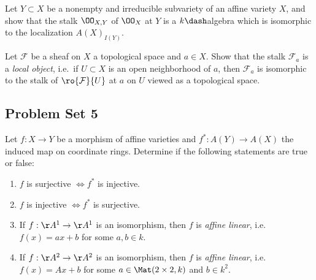 \begin{problem}

Let \(Y\subset X\) be a nonempty and irreducible subvariety of an affine
variety \(X\), and show that the stalk \(\OO_{X, Y}\) of \(\OO_X\) at
\(Y\) is a \(k\dash\)algebra which is isomorphic to the localization
\(A(X)_{I(Y)}\).

\end{problem}

\begin{problem}[Gathmann 3.24]

Let \(\mathcal{F}\) be a sheaf on \(X\) a topological space and
\(a\in X\). Show that the stalk \(\mathcal{F}_a\) is a \emph{local
object}, i.e.~if \(U\subset X\) is an open neighborhood of \(a\), then
\(\mathcal{F}_a\) is isomorphic to the stalk of
\(\ro{ \mathcal{F} }{U}\) at \(a\) on \(U\) viewed as a topological
space.

\end{problem}

\hypertarget{problem-set-5}{%
\subsection{Problem Set 5}\label{problem-set-5}}

\begin{problem}[Gathmann 4.13]

Let \(f:X\to Y\) be a morphism of affine varieties and
\(f^*: A(Y) \to A(X)\) the induced map on coordinate rings. Determine if
the following statements are true or false:

\begin{enumerate}
\def\labelenumi{\alph{enumi}.}
\item
  \(f\) is surjective \(\iff f^*\) is injective.
\item
  \(f\) is injective \(\iff f^*\) is surjective.
\item
  If \(f:\AA^1\to\AA^1\) is an isomorphism, then \(f\) is \emph{affine
  linear}, i.e.~\(f(x) = ax+b\) for some \(a, b\in k\).
\item
  If \(f:\AA^2\to\AA^2\) is an isomorphism, then \(f\) is \emph{affine
  linear}, i.e.~\(f(x) = Ax+b\) for some \(a \in \Mat(2\times 2, k)\)
  and \(b\in k^2\).
\end{enumerate}

\end{problem}

